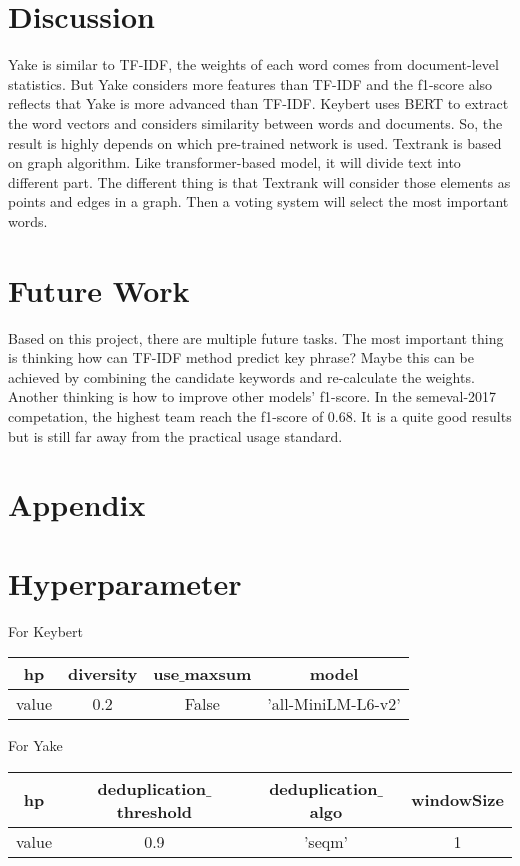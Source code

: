 \documentclass[11pt,a4paper]{article}
\begin{document}
\section{Discussion}
Yake is similar to TF-IDF, the weights of each word comes from document-level statistics. But Yake considers
more features than TF-IDF and the f1-score also reflects that Yake is more advanced than TF-IDF.
\vspace{11pt}
\noindent
Keybert uses BERT to extract the word vectors and considers similarity between words and documents. So, the result is
highly depends on which pre-trained network is used.
\vspace{11pt}
\noindent
Textrank is based on graph algorithm. Like transformer-based model, it will divide text into different part. The different
thing is that Textrank will consider those elements as points and edges in a graph. Then a voting system will
select the most important words.
\vspace{11pt}
\section{Future Work}
Based on this project, there are multiple future tasks. The most important thing is thinking how can
TF-IDF method predict key phrase? Maybe this can be achieved by combining the candidate keywords and re-calculate
the weights. Another thinking is how to improve other models' f1-score.
\vspace{11pt}
\noindent
In the semeval-2017 competation, the highest team reach the f1-score of 0.68. It is a quite good results but is still
far away from the practical usage standard.

\section{Appendix}
\appendix
\section{Hyperparameter}
For Keybert
\begin{center}
    \begin{tabular}{cccc}
        \hline
        hp& diversity&use$\_$maxsum & model\\
        \hline
        value& 0.2& False& 'all-MiniLM-L6-v2' \\
        \hline
    \end{tabular}
\end{center}
\noindent
For Yake
\begin{center}
    \begin{tabular}{cccc}
        \hline
        hp& deduplication$\_$threshold& deduplication$\_$algo& windowSize\\
        \hline
        value&  0.9& 'seqm'& 1 \\
        \hline
    \end{tabular}
\end{center}


\end{document}
